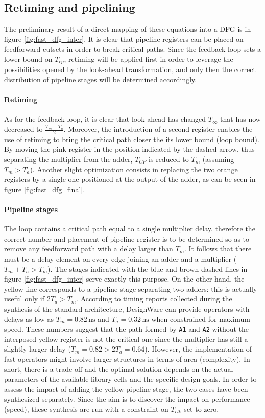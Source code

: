 \subsection{Retiming and pipelining}
The preliminary result of a direct mapping of these equations into a DFG is in figure \autoref{fig:fast_dfg_inter}. It is clear that pipeline registers can be placed on feedforward cutsets in order to break critical paths. Since the feedback loop sets a lower bound on $T_{cp}$, retiming will be applied first in order to leverage the possibilities opened by the look-ahead transformation, and only then the correct distribution of pipeline stages will be determined accordingly.

\paragraph{Retiming} As for the feedback loop, it is clear that look-ahead has changed $T_{\infty}$ that has now decreased to $\frac{T_m+T_a}{2}$. Moreover, the introduction of a second register enables the use of retiming to bring the critical path closer the its lower bound (loop bound). By moving the pink register in the position indicated by the dashed arrow, thus separating the multiplier from the adder, $T_{CP}$ is reduced to $T_m$ (assuming $T_m > T_a$). Another slight optimization consists in replacing the two orange registers by a single one positioned at the output of the adder, as can be seen in figure \autoref{fig:fast_dfg_final}. 

\paragraph{Pipeline stages} The loop contains a critical path equal to a single multiplier delay, therefore the correct number and placement of pipeline register is to be determined so as to remove any feedforward path with a delay larger than $T_m$. It follows that there must be a delay element on every edge joining an adder and a multiplier ($T_m + T_a > T_m$). The stages indicated with the blue and brown dashed lines in figure \autoref{fig:fast_dfg_inter} serve exactly this purpose. On the other hand, the yellow line corresponds to a pipeline stage separating two adders: this is actually useful only if $2T_a>T_m$. According to timing reports collected during the synthesis of the standard architecture, DesignWare can provide operators with delays as low as $T_m = 0.82 \,\textrm{ns}$ and $T_a=0.32\,\textrm{ns}$ when constrained for maximum speed. These numbers suggest that the path formed by \texttt{A1} and \texttt{A2} without the interposed yellow register is not the critical one since the multiplier has still a slightly larger delay ($T_m=0.82 > 2T_a =0.64$). However, the implementation of fast operators might involve larger structures in terms of area (complexity). In short, there is a trade off and the optimal solution depends on the actual parameters of the available library cells and the specific design goals. In order to assess the impact of adding the yellow pipeline stage, the two cases have been synthesized separately. Since the aim is to discover the impact on performance (speed), these synthesis are run with a constraint on $T_{clk}$ set to zero.

